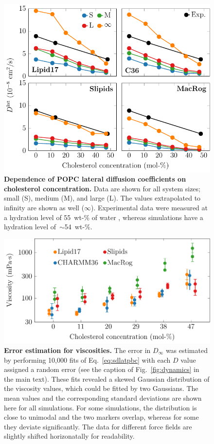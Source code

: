 \documentclass[journal=jpcbfk,manuscript=suppinfo]{achemso}
\begin{document}
\begin{figure}[htb!]
    \centering
    \includegraphics[width=0.9\linewidth]{../FIGS/d_vs_chol.pdf}
    \caption{\label{SIfig:dvschol}%
     \textbf{Dependence of POPC lateral diffusion coefficients on cholesterol concentration.} Data are shown for all system sizes; small (S), medium (M), and large (L). The values extrapolated to infinity are shown as well ($\infty$). Experimental data were measured at a hydration level of 55~wt-\% of water \cite{filippov2003effect,filippov2003influence}, whereas simulations have a hydration level of~$\sim$54~wt-\%.
    }
\end{figure}

\begin{figure}[htb!]
    \centering
    \includegraphics[width=0.8\linewidth]{../FIGS/viscoerrors.pdf}
    \caption{\label{SIfig:viscoerrors}%
    \textbf{Error estimation for viscosities.}
    The error in $D_\infty$ was estimated by performing 10,000 fits of Eq.~\eqref{eq:sdlatpbc} with each $D$ value assigned a random error (see the caption of Fig.~\ref{fig:dynamics} in the main text). These fits revealed a skewed Gaussian distribution of the viscosity values, which could be fitted by two Gaussians. The mean values and the corresponding standard deviations are shown here for all simulations. For some simulations, the distribution is close to unimodal and the two markers overlap, whereas for some they deviate significantly. The data for different force fields are slightly shifted horizonatally for readability.
    }
\end{figure}
\end{document}
